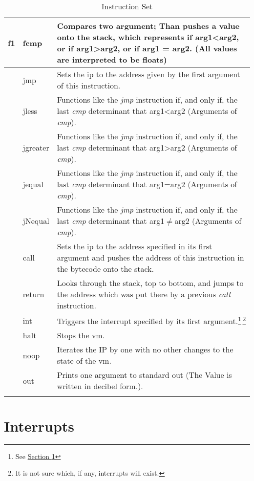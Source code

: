 \documentclass[10pt,a4paper]{article}
\makeatletter
\newcommand\footnoteref[1]{\protected@xdef\@thefnmark{\ref{#1}}\@footnotemark}
\makeatother
\begin{document}
\begin{longtable}[c]{c|l|p{9cm}}
		\hline
		\hex f1 & fcmp & Compares two argument; Than pushes a value onto the stack, which represents if arg1\textless arg2, or if arg1\textgreater arg2, or if arg1 = arg2.\footnoteref{cmp_footnote} (All values are interpreted to be floats) \\
		\hline		
		\hline
		\hex 01 & jmp & Sets the ip to the address given by the first argument of this instruction. \\
		\hline
		\hex 02 & jless & Functions like the \textit{jmp} instruction if, and only if, the last \textit{cmp} determinant that arg1\textless arg2 (Arguments of \textit{cmp}). \\
		\hline
		\hex 03 & jgreater & Functions like the \textit{jmp} instruction if, and only if, the last \textit{cmp} determinant that arg1\textgreater arg2 (Arguments of \textit{cmp}). \\
		\hline
		\hex 04 & jequal & Functions like the \textit{jmp} instruction if, and only if, the last \textit{cmp} determinant that arg1=arg2 (Arguments of \textit{cmp}). \\
		\hline
		\hex 05 & jNequal & Functions like the \textit{jmp} instruction if, and only if, the last \textit{cmp} determinant that arg1\(\neq \)arg2 (Arguments of \textit{cmp}). \\
		\hline
		\hex 06 & call & Sets the ip to the address specified in its first argument and pushes the address of this instruction in the bytecode onto the stack. \\
		\hline
		\hex 07 & return & Looks through the stack, top to bottom, and jumps to the address which was put there by a previous \textit{call} instruction. \\
		\hline
		\hline
		\hex 10 & int & Triggers the interrupt specified by its first argument.\footnote{See \hyperref[interrupts]{Section \ref*{interrupts}}}\,\footnote{It is not sure which, if any, interrupts will exist.} \\
		\hline
		\hex 11 & halt & Stops the vm. \\
		\hline
		\hex 12 & noop & Iterates the IP by one with no other changes to the state of the vm. \\
		\hline
		\hex 13 & out & Prints one argument to standard out (The Value is written in decibel form.). \\
		\hline
		\caption{Instruction Set}
		\end{longtable}
	\section{Interrupts}
	\label{interrupts}
		
\end{document}

